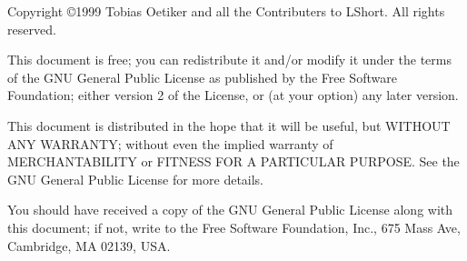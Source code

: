 ﻿%

\ifx\pdfoutput\undefined %
\else
{}
\fi
\newlength{\centeroffset}
\setlength{\centeroffset}{-0.5\oddsidemargin}
\addtolength{\centeroffset}{0.5\evensidemargin}
\thispagestyle{empty}
\noindent\hspace*{\centeroffset}

\noindent\hspace*{\centeroffset}



\pagebreak
\begin{small} 
  Copyright \copyright 1999 Tobias Oetiker and all the Contributers to
  LShort.  All rights reserved.
 
  This document is free; you can redistribute it and/or modify it
  under the terms of the GNU General Public License as published by
  the Free Software Foundation; either version 2 of the License, or
  (at your option) any later version.
  
  This document is distributed in the hope that it will be useful, but
  WITHOUT ANY WARRANTY; without even the implied warranty of
  MERCHANTABILITY or FITNESS FOR A PARTICULAR PURPOSE\@.  See the GNU
  General Public License for more details.
  
  You should have received a copy of the GNU General Public License
  along with this document; if not, write to the Free Software
  Foundation, Inc., 675 Mass Ave, Cambridge, MA 02139, USA.

\end{small}


\endinput


